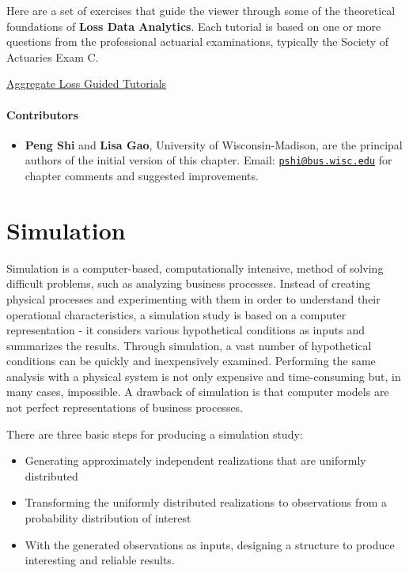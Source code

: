 \documentclass[]{book}
\providecommand{\tightlist}{%
  \setlength{\itemsep}{0pt}\setlength{\parskip}{0pt}}
\theoremstyle{definition}
\theoremstyle{definition}
\theoremstyle{definition}
\theoremstyle{remark}
\begin{document}
Here are a set of exercises that guide the viewer through some of the
theoretical foundations of \textbf{Loss Data Analytics}. Each tutorial
is based on one or more questions from the professional actuarial
examinations, typically the Society of Actuaries Exam C.

\href{https://www.ssc.wisc.edu/~jfrees/loss-data-analytics/aggregate-loss-guided-tutorials/}{Aggregate
Loss Guided Tutorials}

\subsubsection*{Contributors}\label{contributors-4}

\begin{itemize}
\tightlist
\item
  \textbf{Peng Shi} and \textbf{Lisa Gao}, University of
  Wisconsin-Madison, are the principal authors of the initial version of
  this chapter. Email:
  \href{mailto:pshi@bus.wisc.edu}{\nolinkurl{pshi@bus.wisc.edu}} for
  chapter comments and suggested improvements.
\end{itemize}

\chapter{Simulation}\label{simulation-1}

Simulation is a computer-based, computationally intensive, method of
solving difficult problems, such as analyzing business processes.
Instead of creating physical processes and experimenting with them in
order to understand their operational characteristics, a simulation
study is based on a computer representation - it considers various
hypothetical conditions as inputs and summarizes the results. Through
simulation, a vast number of hypothetical conditions can be quickly and
inexpensively examined. Performing the same analysis with a physical
system is not only expensive and time-consuming but, in many cases,
impossible. A drawback of simulation is that computer models are not
perfect representations of business processes.

There are three basic steps for producing a simulation study:

\begin{itemize}
\item
  Generating approximately independent realizations that are uniformly
  distributed
\item
  Transforming the uniformly distributed realizations to observations
  from a probability distribution of interest
\item
  With the generated observations as inputs, designing a structure to
  produce interesting and reliable results.
\end{itemize}
\end{document}
